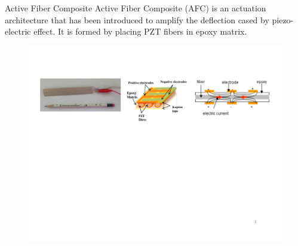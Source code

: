 \documentclass{beamer}
\begin{document}
\begin{frame}{Active Fiber Composite}
Active Fiber Composite (AFC) is an actuation architecture that has been introduced to amplify the deflection cased by piezo-electric effect.
It is formed by placing PZT fibers in epoxy matrix. 
\begin{figure}
\includegraphics[scale=0.35,trim = 0mm 0mm 0mm 0mm]{../images/active_fiber_composite_pictures.pdf}
\end{figure}
\end{frame}
\end{document}

